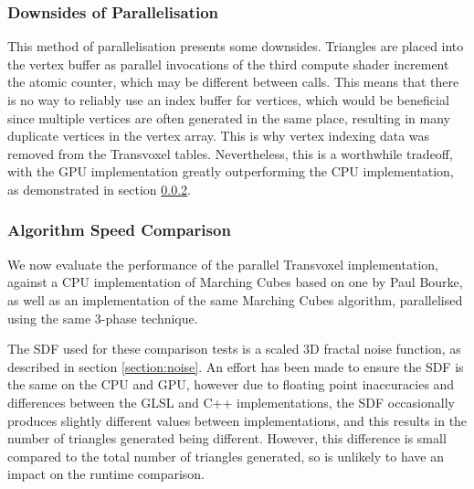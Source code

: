 \documentclass[11pt]{article}
\begin{document}
\subsubsection{Downsides of Parallelisation}
\label{section:downsides}
This method of parallelisation presents some downsides. Triangles are placed into the vertex buffer as parallel invocations of the third compute shader increment the atomic counter, which may be different between calls. This means that there is no way to reliably use an index buffer for vertices, which would be beneficial since multiple vertices are often generated in the same place, resulting in many duplicate vertices in the vertex array. This is why vertex indexing data was removed from the Transvoxel tables. Nevertheless, this is a worthwhile tradeoff, with the GPU implementation greatly outperforming the CPU implementation, as demonstrated in section \ref{section:GPUCPUcomparison}.



\subsubsection{Algorithm Speed Comparison}
\label{section:GPUCPUcomparison}
We now evaluate the performance of the parallel Transvoxel implementation, against a CPU implementation of Marching Cubes based on one by Paul Bourke\cite{bourke_1994}, as well as an implementation of the same Marching Cubes algorithm, parallelised using the same 3-phase technique.

The SDF used for these comparison tests is a scaled 3D fractal noise function, as described in section \ref{section:noise}. An effort has been made to ensure the SDF is the same on the CPU and GPU, however due to floating point inaccuracies and differences between the GLSL and C++ implementations, the SDF occasionally produces slightly different values between implementations, and this results in the number of triangles generated being different. However, this difference is small compared to the total number of triangles generated, so is unlikely to have an impact on the runtime comparison.
\end{document}
